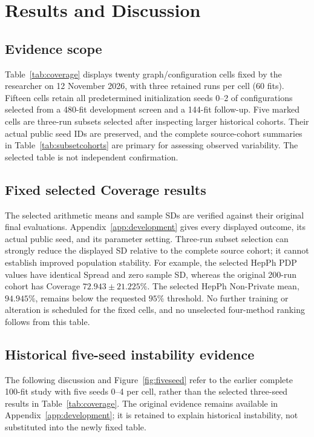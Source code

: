 \chapter{Results and Discussion}\label{ch:results}
\section{Evidence scope}
Table~\ref{tab:coverage} displays twenty graph/configuration cells fixed by the researcher on 12 November 2026, with three retained runs per cell (60 fits). Fifteen cells retain all predetermined initialization seeds 0--2 of configurations selected from a 480-fit development screen and a 144-fit follow-up. Five marked cells are three-run subsets selected after inspecting larger historical cohorts. Their actual public seed IDs are preserved, and the complete source-cohort summaries in Table~\ref{tab:subsetcohorts} are primary for assessing observed variability. The selected table is not independent confirmation.

\section{Fixed selected Coverage results}

The selected arithmetic means and sample SDs are verified against their original final evaluations. Appendix~\ref{app:development} gives every displayed outcome, its actual public seed, and its parameter setting. Three-run subset selection can strongly reduce the displayed SD relative to the complete source cohort; it cannot establish improved population stability. For example, the selected HepPh PDP values have identical Spread and zero sample SD, whereas the original 200-run cohort has Coverage $72.943\pm21.225\%$. The selected HepPh Non-Private mean, $94.945\%$, remains below the requested $95\%$ threshold. No further training or alteration is scheduled for the fixed cells, and no unselected four-method ranking follows from this table.

\section{Historical five-seed instability evidence}
The following discussion and Figure~\ref{fig:fiveseed} refer to the earlier complete 100-fit study with five seeds 0--4 per cell, rather than the selected three-seed results in Table~\ref{tab:coverage}. The original evidence remains available in Appendix~\ref{app:development}; it is retained to explain historical instability, not substituted into the newly fixed table.

